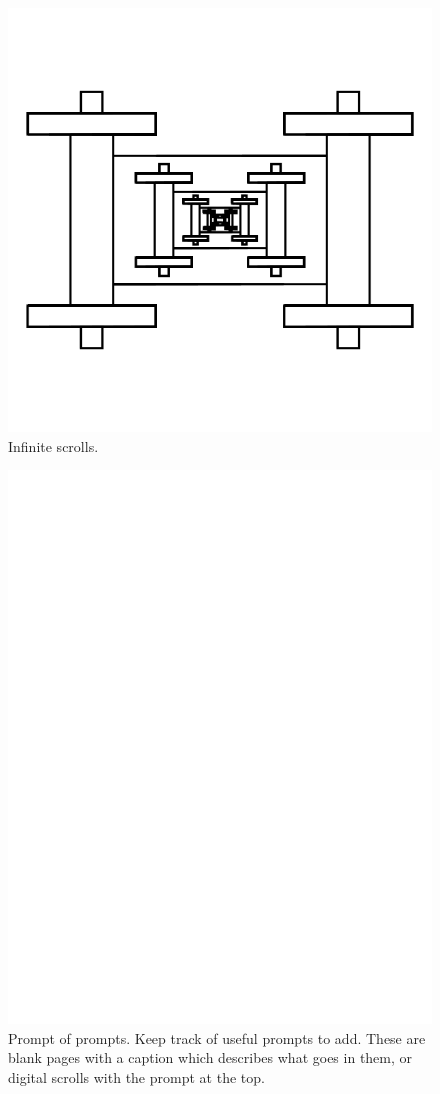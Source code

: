 \documentclass{report}
\begin{document}
\begin{figure}
	\centering
	\includegraphics[width=5in]{imageserver/uploadimages/image17.png}
	\caption{Infinite scrolls.}
\end{figure}


\begin{figure}
	\centering
	\includegraphics[width=5in]{imageserver/uploadimages/image3.png}
	\caption{Prompt of prompts. Keep track of useful prompts to add.  These are blank pages with a caption which describes what goes in them, or digital scrolls with the prompt at the top.}
\end{figure}
\end{document}
